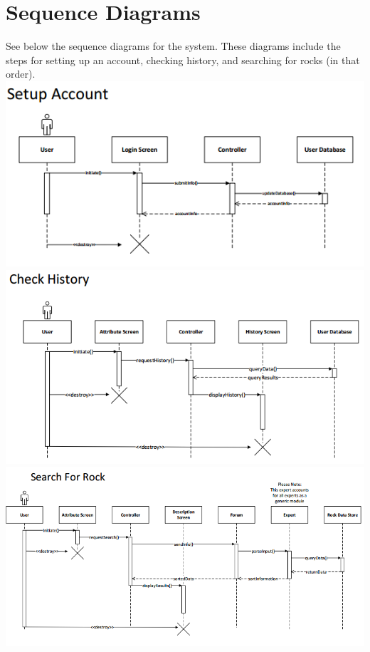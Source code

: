 \documentclass[titlepage]{article}
\begin{document}
\section{Sequence Diagrams}
See below the sequence diagrams for the system. These diagrams include the steps for setting up an account, checking history, and searching for rocks (in that order).\\
\includegraphics[scale=1]{../resources/SequenceDiagrams/setupAccount.png}\\
\includegraphics*[scale=1]{../resources/SequenceDiagrams/checkHistory.png}\\
\includegraphics*[scale=0.8]{../resources/SequenceDiagrams/searchForRock.png}\\
\end{document}
